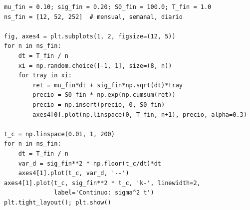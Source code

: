 \documentclass[12pt, a4paper]{article}
\begin{document}
\begin{lstlisting}[style=python, caption={Figura 4: Modelo financiero discreto a distintas frecuencias.}]
mu_fin = 0.10; sig_fin = 0.20; S0_fin = 100.0; T_fin = 1.0
ns_fin = [12, 52, 252]  # mensual, semanal, diario

fig, axes4 = plt.subplots(1, 2, figsize=(12, 5))
for n in ns_fin:
    dt = T_fin / n
    xi = np.random.choice([-1, 1], size=(8, n))
    for tray in xi:
        ret = mu_fin*dt + sig_fin*np.sqrt(dt)*tray
        precio = S0_fin * np.exp(np.cumsum(ret))
        precio = np.insert(precio, 0, S0_fin)
        axes4[0].plot(np.linspace(0, T_fin, n+1), precio, alpha=0.3)

t_c = np.linspace(0.01, 1, 200)
for n in ns_fin:
    dt = T_fin / n
    var_d = sig_fin**2 * np.floor(t_c/dt)*dt
    axes4[1].plot(t_c, var_d, '--')
axes4[1].plot(t_c, sig_fin**2 * t_c, 'k-', linewidth=2,
              label='Continuo: sigma^2 t')
plt.tight_layout(); plt.show()
\end{lstlisting}
\end{document}
